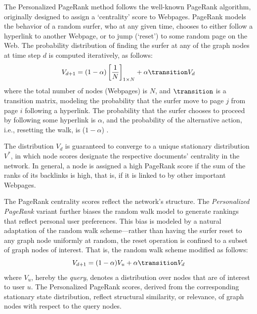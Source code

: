 \documentclass[ijoc,nonblindrev]{informs3} %
\numberwithin{equation}{subsection}
\begin{document}
The Personalized PageRank method follows the well-known PageRank algorithm, originally designed to assign a `centrality' score to Webpages. PageRank models the behavior of a random surfer, who at any given time, chooses to either follow a hyperlink to another Webpage, or to jump (`reset') to some random page on the Web. The probability distribution of finding the surfer at any of the graph nodes at time step $d$ is computed iteratively, as follows:
\begin{equation}
V_{d+1} = (1-\alpha) \left[{1 \over N}\right]_{1 \times N} + \alpha \transition V_d
\label{eq:pagerank}
\end{equation}
where the total number of nodes (Webpages) is $N$, and $\transition$
is a transition matrix, modeling the probability that the surfer move
to page $j$ from page $i$ following a hyperlink. The probability that
the surfer chooses to proceed by following some hyperlink is $\alpha$, and the probability of the alternative action, i.e., resetting the walk, is ($1-\alpha$) .

The distribution $V_d$ is guaranteed to converge to a unique stationary distribution $V^*$, in which node scores designate the respective documents' centrality in the network. In general, a node is assigned a high PageRank score if the sum of the ranks of its backlinks is high, that is, if it is linked to by other important Webpages.

The PageRank centrality scores reflect the network's structure. The {\it Personalized PageRank} variant further biases the random walk model to
generate rankings that reflect personal user preferences. This bias is modeled by a natural adaptation of the random walk scheme---rather than having the surfer reset to any graph node uniformly at random, the reset operation is confined to a subset of graph nodes of interest. That is, the random walk scheme modified as follows:
\begin{equation}
V_{d+1} = (1-\alpha) V_u + \alpha \transition V_d
\label{eq:ppr}
\end{equation}
where $V_u$, hereby the {\it query}, denotes a distribution over nodes that are of interest to user $u$. The Personalized PageRank scores, derived from the corresponding stationary state distribution, reflect structural similarity, or relevance, of graph nodes with respect to the query nodes.
\end{document}
